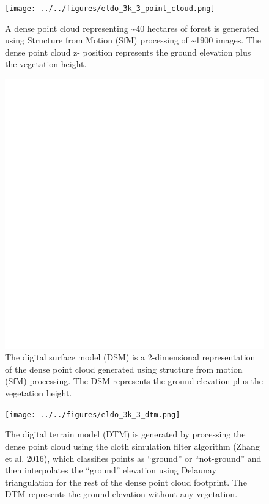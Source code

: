 \documentclass[]{article}
\begin{document}
\begin{figure}
\centering
\texttt{[image: ../../figures/eldo\_3k\_3\_point\_cloud.png]}
\caption{A dense point cloud representing \textasciitilde{}40 hectares
of forest is generated using Structure from Motion (SfM) processing of
\textasciitilde{}1900 images. The dense point cloud z- position
represents the ground elevation plus the vegetation height.}
\end{figure}

\begin{figure}
\centering
\includegraphics{../../figures/eldo_3k_3_dsm.png}
\caption{The digital surface model (DSM) is a 2-dimensional
representation of the dense point cloud generated using structure from
motion (SfM) processing. The DSM represents the ground elevation plus
the vegetation height.}
\end{figure}

\begin{figure}
\centering
\texttt{[image: ../../figures/eldo\_3k\_3\_dtm.png]}
\caption{The digital terrain model (DTM) is generated by processing the
dense point cloud using the cloth simulation filter algorithm (Zhang et
al. 2016), which classifies points as ``ground'' or ``not-ground'' and
then interpolates the ``ground'' elevation using Delaunay triangulation
for the rest of the dense point cloud footprint. The DTM represents the
ground elevation without any vegetation.}
\end{figure}
\end{document}
